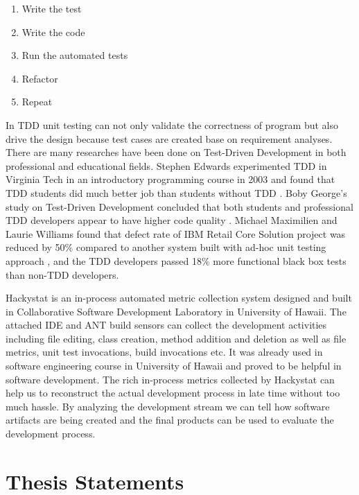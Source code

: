 \documentclass[11pt,twocolumn]{article}
\begin{document}
\begin{enumerate}
\item Write the test
\item Write the code
\item Run the automated tests
\item Refactor
\item Repeat
\end{enumerate}

In TDD unit testing can not only validate the correctness of program but
also drive the design because test cases are created base on requirement
analyses. There are many researches have been done on Test-Driven
Development in both professional and educational fields. Stephen Edwards
experimented TDD in Virginia Tech in an introductory programming course in
2003 and found that TDD students did much better job than students without
TDD \cite{Edwards:04}. Boby George's study on Test-Driven Development
concluded that both students and professional TDD developers appear to have
higher code quality \cite{George:2003}. Michael Maximilien and Laurie
Williams found that defect rate of IBM Retail Core Solution project was
reduced by 50\% compared to another system built with ad-hoc unit testing
approach \cite{Maximilien:2003}, and the TDD developers passed 18\% more
functional black box tests than non-TDD developers.

Hackystat is an in-process automated metric collection system designed and
built in Collaborative Software Development Laboratory in University of
Hawaii. The attached IDE and ANT build sensors can collect the development
activities including file editing, class creation, method addition and
deletion as well as file metrics, unit test invocations, build invocations
etc. It was already used in software engineering course in University of
Hawaii and proved to be helpful in software development. The rich
in-process metrics collected by Hackystat can help us to reconstruct the
actual development process in late time without too much hassle. By
analyzing the development stream we can tell how software artifacts
are being created and the final products can be used to evaluate the
development process.

\section{Thesis Statements}
\label{sec:statement}
\end{document}
